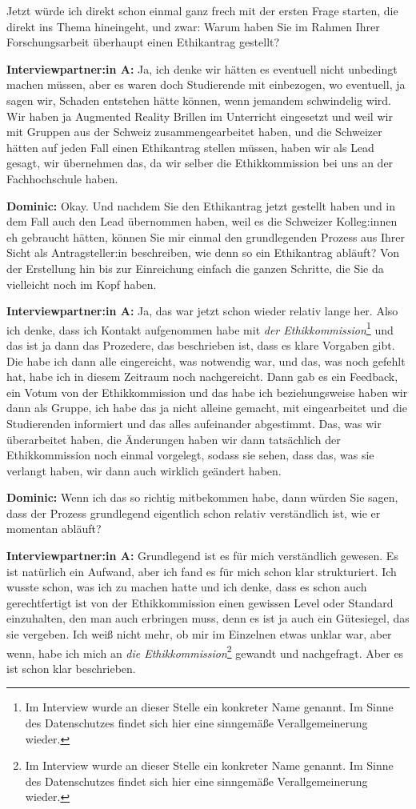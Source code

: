 \documentclass[a4paper,12pt,twoside]{scrreprt}
\begin{document}
Jetzt würde ich direkt schon einmal ganz frech mit der ersten Frage starten, die direkt ins Thema hineingeht, und zwar: Warum haben Sie im Rahmen Ihrer Forschungsarbeit überhaupt einen Ethikantrag gestellt?

\textbf{Interviewpartner:in A:} Ja, ich denke wir hätten es eventuell nicht unbedingt machen müssen, aber es waren doch Studierende mit einbezogen, wo eventuell, ja sagen wir, Schaden entstehen hätte können, wenn jemandem schwindelig wird. Wir haben ja Augmented Reality Brillen im Unterricht eingesetzt und weil wir mit Gruppen aus der Schweiz zusammengearbeitet haben, und die Schweizer hätten auf jeden Fall einen Ethikantrag stellen müssen, haben wir als Lead gesagt, wir übernehmen das, da wir selber die Ethikkommission bei uns an der Fachhochschule haben.

\textbf{Dominic:} Okay. Und nachdem Sie den Ethikantrag jetzt gestellt haben und in dem Fall auch den Lead übernommen haben, weil es die Schweizer Kolleg:innen eh gebraucht hätten, können Sie mir einmal den grundlegenden Prozess aus Ihrer Sicht als Antragsteller:in beschreiben, wie denn so ein Ethikantrag abläuft? Von der Erstellung hin bis zur Einreichung einfach die ganzen Schritte, die Sie da vielleicht noch im Kopf haben.

\textbf{Interviewpartner:in A:} Ja, das war jetzt schon wieder relativ lange her. Also ich denke, dass ich Kontakt aufgenommen habe mit \textit{der Ethikkommission}\footnote{Im Interview wurde an dieser Stelle ein konkreter Name genannt. Im Sinne des Datenschutzes findet sich hier eine sinngemäße Verallgemeinerung wieder.} und das ist ja dann das Prozedere, das beschrieben ist, dass es klare Vorgaben gibt. Die habe ich dann alle eingereicht, was notwendig war, und das, was noch gefehlt hat, habe ich in diesem Zeitraum noch nachgereicht. Dann gab es ein Feedback, ein Votum von der Ethikkommission und das habe ich beziehungsweise haben wir dann als Gruppe, ich habe das ja nicht alleine gemacht, mit eingearbeitet und die Studierenden informiert und das alles aufeinander abgestimmt. Das, was wir überarbeitet haben, die Änderungen haben wir dann tatsächlich der Ethikkommission noch einmal vorgelegt, sodass sie sehen, dass das, was sie verlangt haben, wir dann auch wirklich geändert haben.

\textbf{Dominic:} Wenn ich das so richtig mitbekommen habe, dann würden Sie sagen, dass der Prozess grundlegend eigentlich schon relativ verständlich ist, wie er momentan abläuft?

\textbf{Interviewpartner:in A:} Grundlegend ist es für mich verständlich gewesen. Es ist natürlich ein Aufwand, aber ich fand es für mich schon klar strukturiert. Ich wusste schon, was ich zu machen hatte und ich denke, dass es schon auch gerechtfertigt ist von der Ethikkommission einen gewissen Level oder Standard einzuhalten, den man auch erbringen muss, denn es ist ja auch ein Gütesiegel, das sie vergeben. Ich weiß nicht mehr, ob mir im Einzelnen etwas unklar war, aber wenn, habe ich mich an \textit{die Ethikkommission}\footnote{Im Interview wurde an dieser Stelle ein konkreter Name genannt. Im Sinne des Datenschutzes findet sich hier eine sinngemäße Verallgemeinerung wieder.} gewandt und nachgefragt. Aber es ist schon klar beschrieben.
\end{document}
